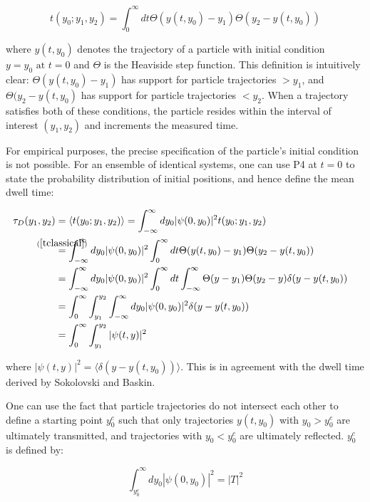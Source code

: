 \documentclass{article}
\begin{document}
\begin{equation}
	t(y_0;y_1,y_2) = \int_0^\infty dt \Theta(y(t,y_0)-y_1)\Theta(y_2-y(t,y_0)) \label{tclassical}
\end{equation}

\noindent where $y(t,y_0)$ denotes the trajectory of a particle with initial condition $y=y_0 \text{ at } t=0$ and $\Theta$ is the Heaviside step function. This definition is intuitively clear: $\Theta(y(t,y_0)-y_1)$ has support for particle trajectories $> y_1$, and $\Theta(y_2-y(t,y_0)$ has support for particle trajectories $<y_2$. When a trajectory satisfies both of these conditions, the particle resides within the interval of interest $(y_1,y_2)$ and increments the measured time.

For empirical purposes, the precise specification of the particle's initial condition is not possible. For an ensemble of identical systems, one can use P4 at $t=0$ to state the probability distribution of initial positions, and hence define the mean dwell time:

\begin{subequations}
\begin{flalign}
	\tau_D(y_1,y_2) &= \langle t(y_0;y_1,y_2) \rangle = \int_{-\infty}^{\infty}dy_{0}|\psi(0,y_0)|^2t(y_0;y_1,y_2)&\\
			&\stackrel{\mathclap{(\ref{tclassical})}}{=} \int_{-\infty}^{\infty}dy_{0}|\psi(0,y_0)|^2 \int_0^\infty dt \Theta(y(t,y_0)-y_1)\Theta(y_2-y(t,y_0)) \\
			&= \int_{-\infty}^{\infty}dy_{0}|\psi(0,y_0)|^2 \int_0^\infty dt \int_{-\infty}^\infty \Theta(y-y_1)\Theta(y_2-y)\delta(y-y(t,y_0))\\
			&= \int_0^\infty \int_{y_1}^{y_2} \int_{-\infty}^\infty dy_{0}|\psi(0,y_0)|^2\delta(y-y(t,y_0))\\
			&= \int_0^\infty \int_{y_1}^{y_2}|\psi(t,y)|^2
\end{flalign}
\end{subequations}

\noindent where $|\psi(t,y)|^2 = \langle \delta(y-y(t,y_0)) \rangle$. This is in agreement with the dwell time derived by Sokolovski and Baskin.

One can use the fact that particle trajectories do not intersect each other to define a starting point $y_0^c$ such that only trajectories $y(t,y_0)$ with $y_0 > y_0^c$ are ultimately transmitted, and trajectories with $y_0 < y_0^c$ are ultimately reflected. $y_0^c$ is defined by:

\begin{equation}
	\int_{y_0^c}^\infty dy_0 |\psi(0,y_0)|^2=|T|^2
\end{equation}
\end{document}

